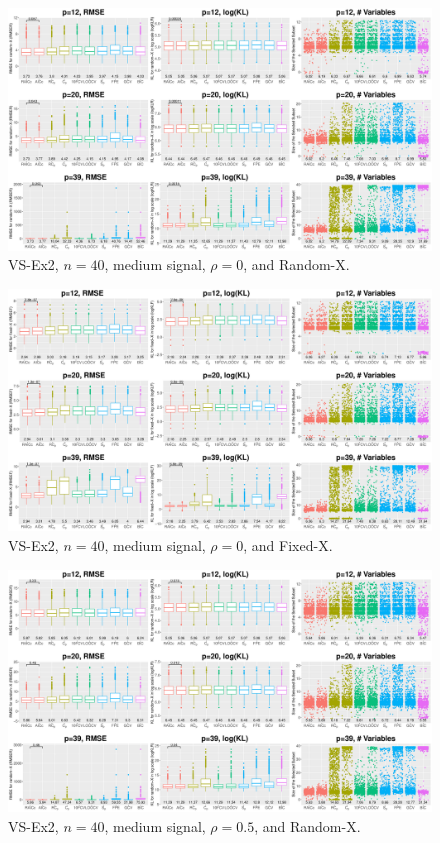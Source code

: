 \clearpage
\begin{figure}[!ht]
\centering
\includegraphics[width=\textwidth]{figures/supplement/randomx_VS-Ex2_n40_msnr_rho0.eps}
\caption{VS-Ex2, $n=40$, medium signal, $\rho=0$, and Random-X.}
\end{figure}
\begin{figure}[!ht]
\centering
\includegraphics[width=\textwidth]{figures/supplement/fixedx_VS-Ex2_n40_msnr_rho0.eps}
\caption{VS-Ex2, $n=40$, medium signal, $\rho=0$, and Fixed-X.}
\end{figure}
\clearpage
\begin{figure}[!ht]
\centering
\includegraphics[width=\textwidth]{figures/supplement/randomx_VS-Ex2_n40_msnr_rho05.eps}
\caption{VS-Ex2, $n=40$, medium signal, $\rho=0.5$, and Random-X.}
\end{figure}
